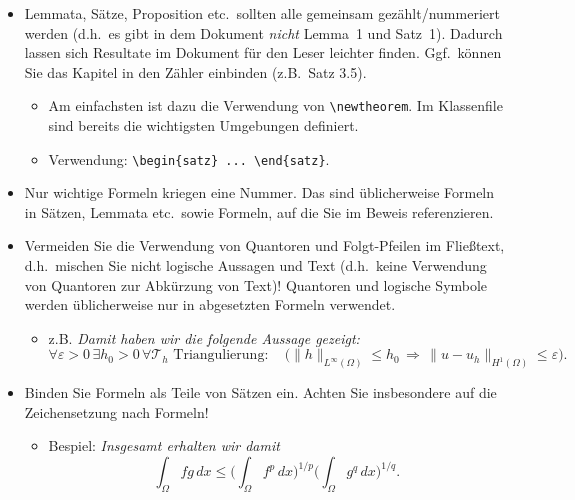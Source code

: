 \begin{itemize}
  \item Lemmata, Sätze, Proposition etc.\ sollten alle gemeinsam gezählt/nummeriert werden (d.h.\ es gibt in dem Dokument \emph{nicht} Lemma~1 und Satz~1). Dadurch lassen sich Resultate im Dokument für den Leser leichter finden. Ggf.\ können Sie das Kapitel in den Zähler einbinden (z.B.\ Satz 3.5).
        \begin{itemize}
          \item Am einfachsten ist dazu die Verwendung von \verb$\newtheorem$. 
          Im Klassenfile sind bereits die wichtigsten Umgebungen definiert. 
          \item Verwendung: \verb$\begin{satz} ... \end{satz}$.
        \end{itemize}

  \item Nur wichtige Formeln kriegen eine Nummer. Das sind üblicherweise Formeln in Sät\-zen, Lemmata etc.\ sowie Formeln, auf die Sie im Beweis referenzieren.

  \item Vermeiden Sie die Verwendung von Quantoren und Folgt-Pfeilen im Fließtext, d.h.\ mischen Sie nicht logische Aussagen und Text (d.h.\ keine Verwendung von Quantoren zur Abkürzung von Text)! Quantoren und logische Symbole werden üblicherweise nur in abgesetzten Formeln verwendet.
        \begin{itemize}
          \item z.B. \emph{Damit haben wir die folgende Aussage gezeigt:
                  \begin{equation*}
                    \forall \varepsilon > 0 \, \exists h_0 > 0 \, \forall \mathcal{T}_h\text{ Triangulierung}:
                    \quad \Big( \| h \|_{L^\infty(\Omega)} \le h_0
                    \, \Longrightarrow \,
                    \| u - u_h \|_{H^1(\Omega)} \le \varepsilon \Big).
                  \end{equation*}}
        \end{itemize}

  \item Binden Sie Formeln als Teile von Sätzen ein. Achten Sie insbesondere auf die Zeichensetzung nach Formeln!
        \begin{itemize}
          \item Bespiel: \emph{Insgesamt erhalten wir damit
                  \begin{equation}\label{eq:hoelder}
                    \int_\Omega fg\,dx
                    \le \bigg(\int_\Omega f^p \, dx\bigg)^{1/p} \bigg(\int_\Omega g^q \, dx\bigg)^{1/q}.
                  \end{equation}}
        \end{itemize}


\end{itemize}
